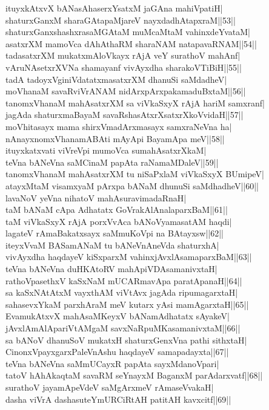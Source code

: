 \documentclass{article}
\begin{document}
ituyxkAtxvX bANasAhaserxYsatxM jaGAna mahiVpatiH|\\
shaturxGanxM sharaGAtapaMjareV nayxdadhAtapxraM||53||\\
shaturxGanxshashxrasaMGAtaM muMcaMtaM vahinxdeYvataM|\\
asatxrXM mamoVca dAhAthaRM sharaNAM natapavaRNAM||54||\\
tadasatxrXM mukatxmAloVkayx rAjA veY surathoV mahAnf|\\
vAruNAsetxrXVNa shamayanf vivAyxdha sharakoVTiBiH||55||\\
tadA tadoyxVginiVdatatxmasatxrXM dhanuSi saMdadheV|\\
moVhanaM savaRviVrANAM nidArxpArxpakamaduBxtaM||56||\\
tanomxVhanaM mahAsatxrXM sa viVkaSxyX rAjA hariM samxranf|\\
jagAda shaturxmaBayaM savaRshasAtxrXsatxrXkoVvidaH||57||\\
moVhitasayx mama shirxVmadArxmasayx samxraNeVna ha|\\
nAnayxnomxVhanamABAti mAyApi BayamApa meV||58||\\
ituyxkatxvati viVreVpi mumoVca sumahAsatxrXkaM|\\
teVna bANeVna saMCinaM papAta raNamaMDaleV||59||\\
tanomxVhanaM mahAsatxrXM tu niSaPxlaM viVkaSxyX BUmipeV|\\
atayxMtaM visamxyaM pArxpa bANaM dhunuSi saMdhadheV||60||\\
lavaNoV yeVna nihatoV mahAsuravimadaRnaH|\\
taM bANaM cApa Adhatatx GoVrakAlAnalaparxBaM||61||\\
taM viVkaSxyX rAjA porxVvAca bANoVyamasatAM haqdi|\\
lagateV rAmaBakatxsayx saMmuKoVpi na BAtayxsw||62||\\
iteyxVvaM BASamANaM tu bANeVnAneVda shaturxhA|\\
vivAyxdha haqdayeV kiSxparxM vahinxjAvxlAsamaparxBaM||63||\\
teVna bANeVna duHKAtoRV mahApiVDAsamanivxtaH|\\
rathoVpasethxV kaSxNaM mUCARmavApa paratApanaH||64||\\
sa kaSxNAtAtxM vayxthAM viVtAvx jagAda ripumagarxtaH|\\
sahasevxYkaM parxhAraM meV kutarx yAsi mamAgarxtaH||65||\\
EvamukAtxvX mahAsaMKeyxV bANamAdhatatx sAyakeV|\\
jAvxlAmAlApariVtAMgaM savxNaRpuMKasamanivxtaM||66||\\
sa bANoV dhanuSoV mukatxH shaturxGenxVna pathi sithxtaH|\\
CinonxVpayxgarxPaleVnAshu haqdayeV samapadayxta||67||\\
teVna bANeVna saMmUCayxR papAta sayxMdanoVpari|\\
tatoV hAhAkaqtaM savaRM seYnayxM BaganxM parAdarxvatf||68||\\
surathoV jayamApeVdeV saMgArxmeV rAmaseVvakaH|\\
dasha viVrA dashasuteYmURCiRtAH patitAH kavxcitf||69||
\end{document}
